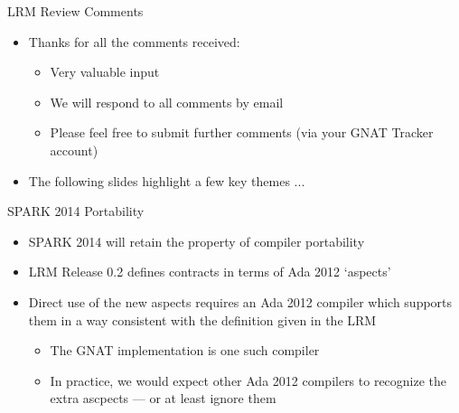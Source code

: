 \documentclass{beamer}
\begin{document}
\begin{frame}{LRM Review Comments}

  \begin{itemize}

  \item Thanks for all the comments received:

    \begin{itemize}
    \item Very valuable input
    \item We will respond to all comments by email
    \item Please feel free to submit further comments (via your GNAT Tracker account)
    \end{itemize}

  \item The following slides highlight a few key themes ...

  \end{itemize}

\end{frame}

\begin{frame}{SPARK 2014 Portability}

  \begin{itemize}
  \item SPARK 2014 will retain the property of compiler portability

  \item LRM Release 0.2 defines contracts in terms of Ada 2012 `aspects'

  \item Direct use of the new aspects requires an Ada 2012 compiler which supports them in a way consistent with the definition given in the LRM

    \begin{itemize}
    \item The GNAT implementation is one such compiler
    \item In practice, we would expect other Ada 2012 compilers to recognize the extra ascpects --- or at least ignore them
    \end{itemize}

\end{itemize}

\end{frame}
\end{document}
